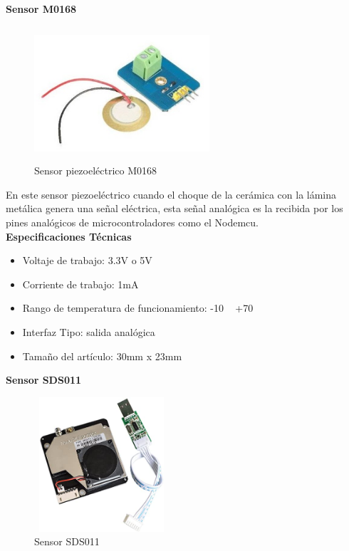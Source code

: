 \textbf{Sensor M0168} %

\begin{figure}[h]
      \centering
      \includegraphics[width=6.5cm, height=5cm]{imagenes/sensor-piezoelectrico.jpg}
      \caption{Sensor piezoeléctrico M0168}
      \label{imag:M0168}
   \end{figure}

En este sensor piezoeléctrico cuando el choque de la cerámica con la lámina metálica genera una señal eléctrica, esta señal analógica es la recibida por los pines analógicos de microcontroladores como el Nodemcu.\\

\textbf{Especificaciones Técnicas}

\begin{itemize}
    \item Voltaje de trabajo: 3.3V o 5V
    \item Corriente de trabajo: 1mA
    \item Rango de temperatura de funcionamiento: -10 ~ +70
    \item Interfaz Tipo: salida analógica
    \item Tamaño del artículo: 30mm x 23mm
\end{itemize}

\textbf{Sensor SDS011} %

\begin{figure}[h]
      \centering
      \includegraphics[width=5cm, height=5cm]{imagenes/Sensor SDS011.jpg}
      \caption{Sensor SDS011}
      \label{imag:SDS011}
   \end{figure}

